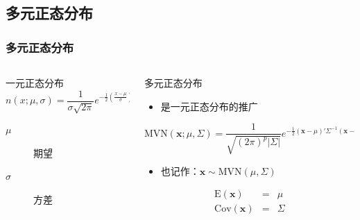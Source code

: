 \documentclass[serif,aspectratio=169]{beamer}
\begin{document}
\subsection{多元正态分布}
\begin{frame}
  \frametitle{多元正态分布}
  \begin{columns}
    \begin{column}{.5\textwidth}
      \begin{block}{一元正态分布}
        $$n(x;\mu,\sigma)=\frac{1}{\sigma\sqrt{2\pi}}e^{-\frac{1}{2}\left(\frac{x-\mu}{\sigma}\right)^2}$$
        \begin{description}
        \item [$\mu$] 期望
        \item [$\sigma$] 方差
        \end{description}
      \end{block}
    \end{column}
    
    \pause
    \begin{column}{.5\textwidth}
      \begin{block}{多元正态分布}
        \begin{itemize}
        \item 是一元正态分布的推广
        \end{itemize}

        $$\mathrm{MVN}(\mathbf{x};\mu,\Sigma)=\frac{1}{\sqrt{(2\pi)^p|\Sigma|}}e^{-\frac{1}{2}(\mathbf{x}-\mu)'\Sigma^{-1}(\mathbf{x}-\mu)}$$

        \begin{itemize}
        \item 也记作：$\mathbf{x}\sim\mathrm{MVN}(\mu,\Sigma)$
        \end{itemize}

        $$
        \begin{array}{rcl}
          \mathrm{E}(\mathbf{x}) & = & \mu\\
          \mathrm{Cov}(\mathbf{x}) & = & \Sigma
        \end{array}
        $$
        
      \end{block}
    \end{column}
  \end{columns}
\end{frame}
\end{document}
